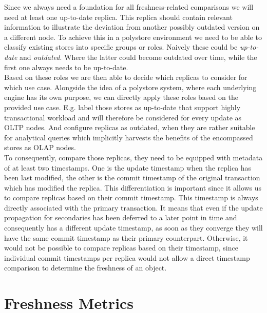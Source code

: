 Since we always need a foundation for all freshness-related comparisons we will need at least one up-to-date replica. 
This replica should contain relevant information to illustrate the deviation from another possibly outdated version on a different node.
To achieve this in a polystore environment we need to be able to classify existing stores into specific groups or roles.
Naively these could be \emph{up-to-date} and \emph{outdated}. Where the latter could become outdated over time, while the first one always needs to be up-to-date. \\
Based on these roles we are then able to decide which replicas to consider for which use case.
Alongside the idea of a polystore system, where each underlying engine has its own purpose, we can directly apply these roles 
based on the provided use case. E.g. label those stores as up-to-date that support highly transactional workload and will therefore be considered for every update as OLTP nodes.
And configure replicas as outdated, when they are rather suitable for analytical queries which implicitly harvests the benefits of the encompassed stores as OLAP nodes. \\
To consequently, compare those replicas, they need to be equipped with metadata of at least two timestamps. 
One is the update timestamp when the replica has been last modified,
the other is the commit timestamp of the original transaction which has modified the replica.
This differentiation is important since it allows us to compare replicas based on their commit timestamp. This timestamp is always directly associated with the primary transaction.
It means that even if the update propagation for secondaries has been deferred to a later point in time and consequently has a different update timestamp, 
as soon as they converge they will have the same commit timestamp as their primary counterpart.
Otherwise, it would not be possible to compare replicas based on their timestamp, since individual commit timestamps per replica would not allow a direct timestamp comparison 
to determine the freshness of an object.



\section{Freshness Metrics}
\label{sec:freshne_metrics}

